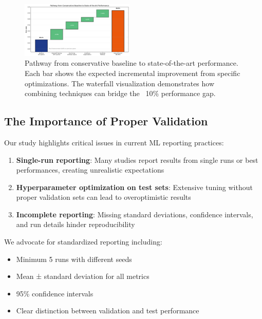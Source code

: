 \documentclass[conference]{IEEEtran}
\begin{document}
\begin{figure}[H]
\centering
\includegraphics[width=0.48\textwidth]{figures/performance_bridge.pdf}
\caption{Pathway from conservative baseline to state-of-the-art performance. Each bar shows the expected incremental improvement from specific optimizations. The waterfall visualization demonstrates how combining techniques can bridge the ~10\% performance gap.}
\label{fig:performance_bridge}
\end{figure}

\subsection{The Importance of Proper Validation}

Our study highlights critical issues in current ML reporting practices:

\begin{enumerate}
    \item \textbf{Single-run reporting}: Many studies report results from single runs or best performances, creating unrealistic expectations
    
    \item \textbf{Hyperparameter optimization on test sets}: Extensive tuning without proper validation sets can lead to overoptimistic results
    
    \item \textbf{Incomplete reporting}: Missing standard deviations, confidence intervals, and run details hinder reproducibility
\end{enumerate}

We advocate for standardized reporting including:
\begin{itemize}
    \item Minimum 5 runs with different seeds
    \item Mean ± standard deviation for all metrics
    \item 95\% confidence intervals
    \item Clear distinction between validation and test performance
\end{itemize}
\end{document}
